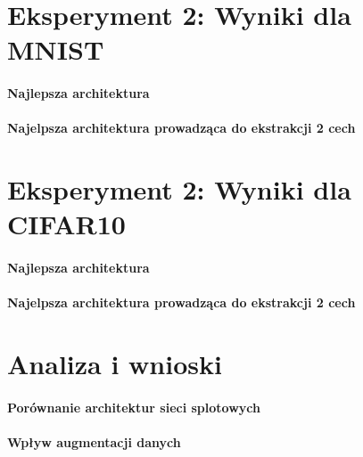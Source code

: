 \documentclass[10pt]{article}
\begin{document}
\pagebreak
\section{Eksperyment 2: Wyniki dla MNIST}\label{sec:ex2_mnist}

\paragraph{Najlepsza architektura}
\paragraph{Najelpsza architektura prowadząca do ekstrakcji 2 cech}

\pagebreak
\section{Eksperyment 2: Wyniki dla CIFAR10}\label{sec:ex2_cifar}

\paragraph{Najlepsza architektura}
\paragraph{Najelpsza architektura prowadząca do ekstrakcji 2 cech}

\pagebreak
\section{Analiza i wnioski}\label{sec:wyniki}

\paragraph{Porównanie architektur sieci splotowych}

\paragraph{Wpływ augmentacji danych}
\end{document}
